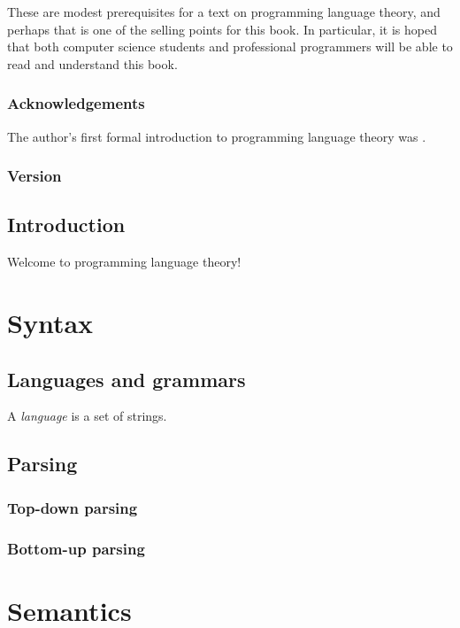 \documentclass[oneside]{book}
\begin{document}
      These are modest prerequisites for a text on programming language theory, and perhaps that is one of the selling points for this book. In particular, it is hoped that both computer science students and professional programmers will be able to read and understand this book.

    \section*{Acknowledgements}

      The author's first formal introduction to programming language theory was \textcite{tapl}.

    \section*{Version}

      

  \mainmatter

  \chapter{Introduction}

    Welcome to programming language theory!

  \part{Syntax}

    \chapter{Languages and grammars}

      A \emph{language} is a set of strings.

    \chapter{Parsing}

      \section{Top-down parsing}

      \section{Bottom-up parsing}

  \part{Semantics}
\end{document}
